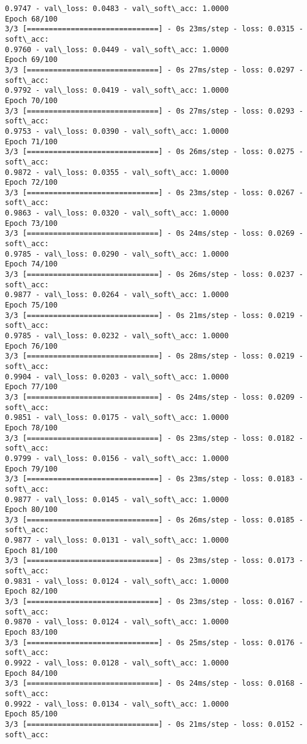 \documentclass[11pt]{article}
\begin{document}
\begin{Verbatim}[commandchars=\\\{\}]
0.9747 - val\_loss: 0.0483 - val\_soft\_acc: 1.0000
Epoch 68/100
3/3 [==============================] - 0s 23ms/step - loss: 0.0315 - soft\_acc:
0.9760 - val\_loss: 0.0449 - val\_soft\_acc: 1.0000
Epoch 69/100
3/3 [==============================] - 0s 27ms/step - loss: 0.0297 - soft\_acc:
0.9792 - val\_loss: 0.0419 - val\_soft\_acc: 1.0000
Epoch 70/100
3/3 [==============================] - 0s 27ms/step - loss: 0.0293 - soft\_acc:
0.9753 - val\_loss: 0.0390 - val\_soft\_acc: 1.0000
Epoch 71/100
3/3 [==============================] - 0s 26ms/step - loss: 0.0275 - soft\_acc:
0.9872 - val\_loss: 0.0355 - val\_soft\_acc: 1.0000
Epoch 72/100
3/3 [==============================] - 0s 23ms/step - loss: 0.0267 - soft\_acc:
0.9863 - val\_loss: 0.0320 - val\_soft\_acc: 1.0000
Epoch 73/100
3/3 [==============================] - 0s 24ms/step - loss: 0.0269 - soft\_acc:
0.9785 - val\_loss: 0.0290 - val\_soft\_acc: 1.0000
Epoch 74/100
3/3 [==============================] - 0s 26ms/step - loss: 0.0237 - soft\_acc:
0.9877 - val\_loss: 0.0264 - val\_soft\_acc: 1.0000
Epoch 75/100
3/3 [==============================] - 0s 21ms/step - loss: 0.0219 - soft\_acc:
0.9785 - val\_loss: 0.0232 - val\_soft\_acc: 1.0000
Epoch 76/100
3/3 [==============================] - 0s 28ms/step - loss: 0.0219 - soft\_acc:
0.9904 - val\_loss: 0.0203 - val\_soft\_acc: 1.0000
Epoch 77/100
3/3 [==============================] - 0s 24ms/step - loss: 0.0209 - soft\_acc:
0.9851 - val\_loss: 0.0175 - val\_soft\_acc: 1.0000
Epoch 78/100
3/3 [==============================] - 0s 23ms/step - loss: 0.0182 - soft\_acc:
0.9799 - val\_loss: 0.0156 - val\_soft\_acc: 1.0000
Epoch 79/100
3/3 [==============================] - 0s 23ms/step - loss: 0.0183 - soft\_acc:
0.9877 - val\_loss: 0.0145 - val\_soft\_acc: 1.0000
Epoch 80/100
3/3 [==============================] - 0s 26ms/step - loss: 0.0185 - soft\_acc:
0.9877 - val\_loss: 0.0131 - val\_soft\_acc: 1.0000
Epoch 81/100
3/3 [==============================] - 0s 23ms/step - loss: 0.0173 - soft\_acc:
0.9831 - val\_loss: 0.0124 - val\_soft\_acc: 1.0000
Epoch 82/100
3/3 [==============================] - 0s 23ms/step - loss: 0.0167 - soft\_acc:
0.9870 - val\_loss: 0.0124 - val\_soft\_acc: 1.0000
Epoch 83/100
3/3 [==============================] - 0s 25ms/step - loss: 0.0176 - soft\_acc:
0.9922 - val\_loss: 0.0128 - val\_soft\_acc: 1.0000
Epoch 84/100
3/3 [==============================] - 0s 24ms/step - loss: 0.0168 - soft\_acc:
0.9922 - val\_loss: 0.0134 - val\_soft\_acc: 1.0000
Epoch 85/100
3/3 [==============================] - 0s 21ms/step - loss: 0.0152 - soft\_acc:

\end{Verbatim}
\end{document}
